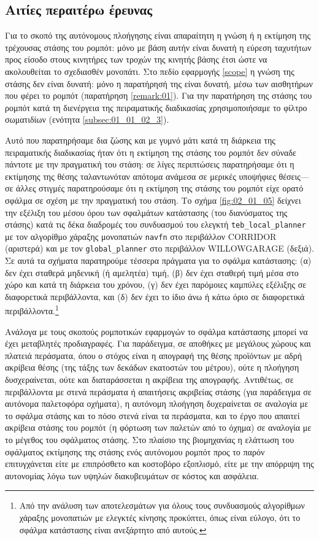 \subsection{Αιτίες περαιτέρω έρευνας}

Για το σκοπό της αυτόνομους πλοήγησης είναι απαραίτητη η γνώση ή η εκτίμηση της
τρέχουσας στάσης του ρομπότ: μόνο με βάση αυτήν είναι δυνατή η εύρεση ταχυτήτων
προς είσοδο στους κινητήρες των τροχών της κινητής βάσης έτσι ώστε να
ακολουθείται το σχεδιασθέν μονοπάτι. Στο πεδίο εφαρμογής \ref{scope} η γνώση
της στάσης δεν είναι δυνατή: μόνο η παρατήρησή της είναι δυνατή, μέσω των
αισθητήρων που φέρει το ρομπότ (παρατήρηση \ref{remark:01}). Για την παρατήρηση
της στάσης του ρομπότ κατά τη διενέργεια της πειραματικής διαδικασίας
χρησιμοποιήσαμε το φίλτρο σωματιδίων (ενότητα \ref{subsec:01_01_02_3}).

Αυτό που παρατηρήσαμε δια ζώσης και με γυμνό μάτι κατά τη διάρκεια της
πειραματικής διαδικασίας ήταν ότι η εκτίμηση της στάσης του ρομπότ δεν σύναδε
πάντοτε με την πραγματική του στάση: σε λίγες περιπτώσεις παρατηρήσαμε ότι η
εκτίμησης της θέσης ταλαντωνόταν απότομα ανάμεσα σε μερικές υποψήφιες
θέσεις---σε άλλες στιγμές παρατηρούσαμε ότι η εκτίμηση της στάσης του ρομπότ
είχε ορατό σφάλμα σε σχέση με την πραγματική του στάση. Το σχήμα
\ref{fig:02_01_05} δείχνει την εξέλιξη του μέσου όρου των σφαλμάτων κατάστασης
(του διανύσματος της στάσης) κατά τις δέκα διαδρομές του συνδυασμού του ελεγκτή
\texttt{teb\_local\_planner} με τον αλγορίθμο χάραξης μονοπατιών \texttt{navfn}
στο περιβάλλον CORRIDOR (αριστερά) και με τον \texttt{global\_planner} στο
περιβάλλον WILLOWGARAGE (δεξιά). Σε αυτά τα σχήματα παρατηρούμε τέσσερα
πράγματα για το σφάλμα κατάστασης:
(α) δεν έχει σταθερά μηδενική (ή αμελητέα) τιμή,
(β) δεν έχει σταθερή τιμή μέσα στο χώρο και κατά τη διάρκεια του χρόνου,
(γ) δεν έχει παρόμοιες καμπύλες εξέλιξης σε διαφορετικά περιβάλλοντα, και
(δ) δεν έχει το ίδιο άνω ή κάτω όριο σε διαφορετικά περιβάλλοντα.\footnote{Από
την ανάλυση των αποτελεσμάτων για όλους τους συνδυασμούς αλγορίθμων χάραξης
μονοπατιών με ελεγκτές κίνησης προκύπτει, όπως είναι εύλογο, ότι το σφάλμα
κατάστασης είναι ανεξάρτητο από αυτούς.}

Ανάλογα με τους σκοπούς ρομποτικών εφαρμογών το σφάλμα κατάστασης μπορεί να
έχει μεταβλητές προδιαγραφές. Για παράδειγμα, σε αποθήκες με μεγάλους χώρους και
πλατειά περάσματα, όπου ο στόχος είναι η απογραφή της θέσης προϊόντων με αδρή
ακρίβεια θέσης (της τάξης των δεκάδων εκατοστών του μέτρου), ούτε η πλοήγηση
δυσχεραίνεται, ούτε και διαταράσσεται η ακρίβεια της απογραφής. Αντιθέτως,
σε περιβάλλοντα με στενά περάσματα ή απαιτήσεις ακριβείας στάσης (για παράδειγμα
σε αυτόνομα παλετοφόρα οχήματα), η αυτόνομη πλοήγηση δυχεραίνεται σε αναλογία
με το σφάλμα στάσης και το πόσο στενά είναι τα περάσματα, και το έργο που
απαιτεί ακρίβεια στάσης του ρομπότ (η φόρτωση των παλετών από το όχημα) σε
αναλογία με το μέγεθος του σφάλματος στάσης. Στο πλαίσιο της βιομηχανίας η
ελάττωση του σφάλματος εκτίμησης της στάσης ενός αυτόνομου ρομπότ προς το παρόν
επιτυγχάνεται είτε με επιπρόσθετο και κοστοβόρο εξοπλισμό, είτε με την απόρριψη
της αυτονομίας λόγω των υψηλών διακυβευμάτων σε κόστος και ασφάλεια.

